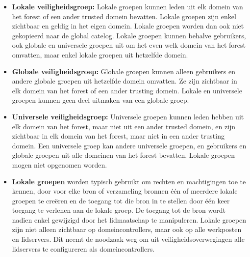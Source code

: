 	\begin{enumerate}
		{
			\begin{itemize}
				\item \textbf{Lokale veiligheidsgroep:} Lokale groepen kunnen leden uit elk domein van het forest of een ander trusted domein bevatten. Lokale groepen zijn enkel zichtbaar en geldig in het eigen domein. Lokale groepen worden dan ook niet gekopieerd naar de global catelog. Lokale groepen kunnen behalve gebruikers, ook globale en universele groepen uit om het even welk domein van het forest omvatten, maar enkel lokale groepen uit hetzelfde domein.
				\item \textbf{Globale veiligheidsgroep:} Globale groepen kunnen alleen gebruikers en andere globale groepen uit hetzelfde domein omvatten. Ze zijn zichtbaar in elk domein van het forest of een ander trusting domein. Lokale en universele groepen kunnen geen deel uitmaken van een globale groep.
				\item \textbf{Universele veiligheidsgroep:} Universele groepen kunnen leden hebben uit elk domein van het forest, maar niet uit een ander trusted domein, en zijn zichtbaar in elk domein van het forest, maar niet in een ander trusting domein. Een universele groep kan andere universele groepen, en gebruikers en globale groepen uit alle domeinen van het forest bevatten. Lokale groepen mogen niet opgenomen worden.
			\end{itemize}
		}
		{ 
			\begin{itemize}
				\item \textbf{Lokale groepen} worden typisch gebruikt om rechten en machtigingen toe te kennen, door voor elke bron of verzameling bronnen één of meerdere lokale groepen te creëren en de toegang tot die bron in te stellen door één keer toegang te verlenen aan de lokale groep. De toegang tot de bron wordt nadien enkel gewijzigd door het lidmaatschap te manipuleren. Lokale groepen zijn niet alleen zichtbaar op domeincontrollers, maar ook op alle werkposten en lidservers. Dit neemt de noodzaak weg om uit veiligheidsoverwegingen alle lidservers te configureren als domeincontrollers.


\end{itemize}}
\end{enumerate}
